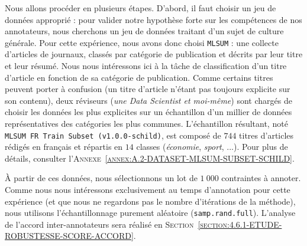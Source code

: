 			Nous allons procéder en plusieurs étapes.
			D'abord, il faut choisir un jeu de données approprié : pour valider notre hypothèse forte sur les compétences de nos annotateurs, nous cherchons un jeu de données traitant d'un sujet de culture générale.
			Pour cette expérience, nous avons donc choisi \texttt{MLSUM} : une collecte d'articles de journaux, classés par catégorie de publication et décrits par leur titre et leur résumé.
			Nous nous intéressons ici à la tâche de classification d'un titre d'article en fonction de sa catégorie de publication.
			Comme certains titres peuvent porter à confusion (un titre d'article n'étant pas toujours explicite sur son contenu), deux réviseurs (\textit{une Data Scientist et moi-même}) sont chargés de choisir les données les plus explicites sur un échantillon d'un millier de données représentatives des catégories les plus communes.
			L'échantillon résultant, noté \texttt{MLSUM FR Train Subset (v1.0.0-schild)}, est composé de $744$ titres d'articles rédigés en français et répartis en $14$ classes (\textit{économie}, \textit{sport}, ...).
			Pour plus de détails, consulter l'\textsc{Annexe~\ref{annex:A.2-DATASET-MLSUM-SUBSET-SCHILD}}.
			
			À partir de ces données, nous sélectionnons un lot de $1~000$ contraintes à annoter.
			Comme nous nous intéressons exclusivement au temps d'annotation pour cette expérience (et que nous ne regardons pas le nombre d'itérations de la méthode), nous utilisons l'échantillonnage purement aléatoire (\texttt{samp.rand.full}).
			L'analyse de l'accord inter-annotateurs sera réalisé en \textsc{Section~\ref{section:4.6.1-ETUDE-ROBUSTESSE-SCORE-ACCORD}}.
			
